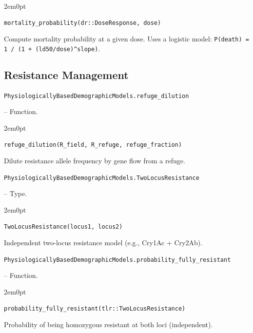 \begin{adjustwidth}{2em}{0pt}


\begin{verbatim}
mortality_probability(dr::DoseResponse, dose)
\end{verbatim}

Compute mortality probability at a given dose. Uses a logistic model: \texttt{P(death) = 1 / (1 + (ld50/dose){\textasciicircum}slope)}.



\end{adjustwidth}

\subsection{Resistance Management}



\label{7150009469281132305}{}

\hypertarget{610752982207181001}{\texttt{PhysiologicallyBasedDemographicModels.refuge\_dilution}}  -- {Function.}

\begin{adjustwidth}{2em}{0pt}


\begin{verbatim}
refuge_dilution(R_field, R_refuge, refuge_fraction)
\end{verbatim}

Dilute resistance allele frequency by gene flow from a refuge.



\end{adjustwidth}
\hypertarget{13513903706040614508}{\texttt{PhysiologicallyBasedDemographicModels.TwoLocusResistance}}  -- {Type.}

\begin{adjustwidth}{2em}{0pt}


\begin{verbatim}
TwoLocusResistance(locus1, locus2)
\end{verbatim}

Independent two-locus resistance model (e.g., Cry1Ac + Cry2Ab).



\end{adjustwidth}
\hypertarget{17260455433682565107}{\texttt{PhysiologicallyBasedDemographicModels.probability\_fully\_resistant}}  -- {Function.}

\begin{adjustwidth}{2em}{0pt}


\begin{verbatim}
probability_fully_resistant(tlr::TwoLocusResistance)
\end{verbatim}

Probability of being homozygous resistant at both loci (independent).



\end{adjustwidth}

